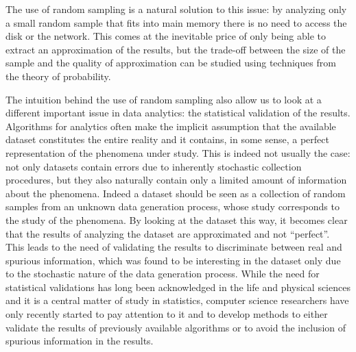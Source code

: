 The use of random sampling is a natural solution to this issue:
by analyzing only a small random sample that fits into main memory there is no
need to access the disk or the network. This comes at the inevitable price of
only being able to extract an approximation of the results, but the trade-off
between the size of the sample and the quality of approximation can be studied
using techniques from the theory of probability. 

The intuition behind the use of random sampling also allow us to look at a
different important issue in data analytics: the statistical validation of the
results. Algorithms for analytics often make the implicit assumption that the
available dataset constitutes the entire reality and it contains, in some sense,
a perfect representation of the phenomena under study. This is indeed not
usually the case: not only datasets contain errors due to inherently stochastic
collection procedures, but they also naturally contain only a limited amount of
information about the phenomena. Indeed a dataset should be seen as a collection
of random samples from an unknown data generation process, whose study
corresponds to the study of the phenomena. By looking at the dataset this way,
it becomes clear that the results of analyzing the dataset are approximated and
not ``perfect''. This leads to the need of validating the results to
discriminate between real and spurious information, which was found to be
interesting in the dataset only due to the stochastic nature of the data
generation process. While the need for statistical validations has long
been acknowledged in the life and physical sciences and it is a central matter of
study in statistics, computer science researchers have only recently started to
pay attention to it and to develop methods to either validate the results of
previously available algorithms or to avoid the inclusion of spurious
information in the results.


